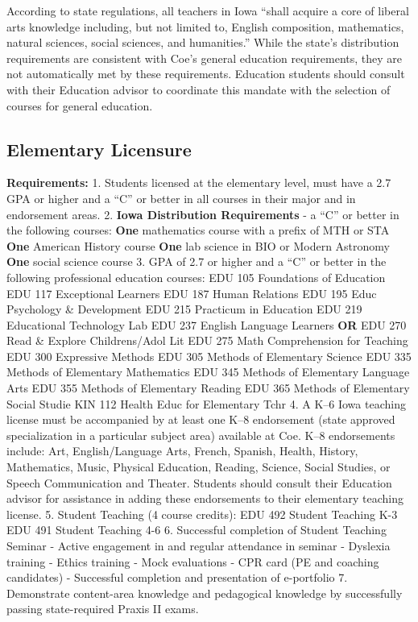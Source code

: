 \documentclass[
  letterpaper,
]{scrbook}
\begin{document}
According to state regulations, all teachers in Iowa ``shall acquire a
core of liberal arts knowledge including, but not limited to, English
composition, mathematics, natural sciences, social sciences, and
humanities.'' While the state's distribution requirements are consistent
with Coe's general education requirements, they are not automatically
met by these requirements. Education students should consult with their
Education advisor to coordinate this mandate with the selection of
courses for general education.

\hypertarget{elementary-licensure}{%
\subsection{Elementary Licensure}\label{elementary-licensure}}

\textbf{Requirements:} 1. Students licensed at the elementary level,
must have a 2.7 GPA or higher and a ``C'' or better in all courses in
their major and in endorsement areas. 2. \textbf{Iowa Distribution
Requirements} - a ``C'' or better in the following courses: \textbf{One}
mathematics course with a prefix of MTH or STA \textbf{One} American
History course \textbf{One} lab science in BIO or Modern Astronomy
\textbf{One} social science course 3. GPA of 2.7 or higher and a ``C''
or better in the following professional education courses: EDU 105
Foundations of Education EDU 117 Exceptional Learners EDU 187 Human
Relations EDU 195 Educ Psychology \& Development EDU 215 Practicum in
Education EDU 219 Educational Technology Lab EDU 237 English Language
Learners \textbf{OR} EDU 270 Read \& Explore Childrens/Adol Lit EDU 275
Math Comprehension for Teaching EDU 300 Expressive Methods EDU 305
Methods of Elementary Science EDU 335 Methods of Elementary Mathematics
EDU 345 Methods of Elementary Language Arts EDU 355 Methods of
Elementary Reading EDU 365 Methods of Elementary Social Studie KIN 112
Health Educ for Elementary Tchr 4. A K--6 Iowa teaching license must be
accompanied by at least one K--8 endorsement (state approved
specialization in a particular subject area) available at Coe. K--8
endorsements include: Art, English/Language Arts, French, Spanish,
Health, History, Mathematics, Music, Physical Education, Reading,
Science, Social Studies, or Speech Communication and Theater. Students
should consult their Education advisor for assistance in adding these
endorsements to their elementary teaching license. 5. Student Teaching
(4 course credits): EDU 492 Student Teaching K-3 EDU 491 Student
Teaching 4-6 6. Successful completion of Student Teaching Seminar -
Active engagement in and regular attendance in seminar - Dyslexia
training - Ethics training - Mock evaluations - CPR card (PE and
coaching candidates) - Successful completion and presentation of
e-portfolio 7. Demonstrate content-area knowledge and pedagogical
knowledge by successfully passing state-required Praxis II exams.
\end{document}
